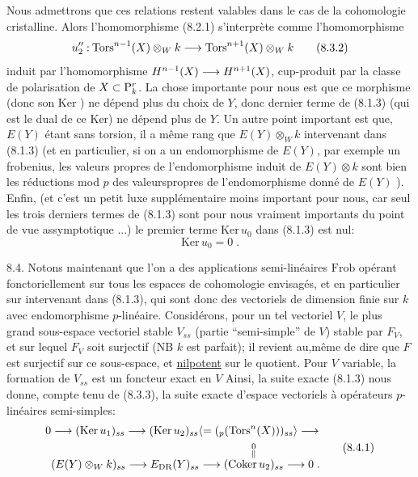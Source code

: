 Nous admettrons que ces relations restent valables dans le cas de la cohomologie cristalline. Alors l'homomorphisme (8.2.1) s'interprète comme l'homomorphisme
\[
u''_2\mathbin{:}\mathrm{Tors}^{n-1}(X)\otimes_W k\longrightarrow\mathrm{Tors}^{n+1}(X)\otimes_W k
\tag*{(8.3.2)}
\]
induit par l'homomorphisme $H^{n-1}(X)\longrightarrow H^{n+1}(X)$, cup-produit par la classe de polarisation de $X\subset\mathrm P^r_k$. La chose importante pour nous est que ce morphisme (donc son Ker ) ne dépend plus du choix de $Y$, donc    dernier terme de (8.1.3)  (qui est le dual de ce Ker) ne dépend plus de $Y$. Un autre point important est que, $E(Y)$ étant sans torsion, il a même rang que $E(Y)\otimes_W k$ intervenant dans (8.1.3) (et en particulier, si on a un endomorphisme de $E(Y)$, par exemple un frobenius, les valeurs propres de l'endomorphisme induit de $E(Y)\otimes k$ sont bien les réductions
mod $p$ des valeurspropres de l'endomorphisme donné de $E(Y)$ ). Enfin, (et c'est un petit luxe supplémentaire moins important pour nous, car seul les trois derniers termes de (8.1.3) sont pour nous vraiment importants du point de vue assymptotique ...)  le premier terme $\mathrm{Ker}\,u_0$ dans (8.1.3) est nul:
\[
\mathrm{Ker}\,u_0=0\;.
\tag*{(8.3.3)}
\]

8.4. Notons maintenant que l'on a des applications semi-linéaires $\mathrm{Frob}$ opérant fonctoriellement sur tous les espaces de cohomologie envisagés, et en particulier sur   intervenant dans (8.1.3), qui sont donc des vectoriels de dimension finie sur $k$ avec endomorphisme $p$-linéaire. Considérons, pour un tel vectoriel $V$, le plus grand sous-espace vectoriel stable $V_{ss}$ (partie ``semi-simple'' de $V$) stable par $F_V$, et sur lequel $F_V$ soit  surjectif (NB $k$ est parfait);  il revient au,même de dire que $F$ est surjectif sur ce sous-espace, et \uline{nilpotent} sur le quotient. Pour $V$ variable, la formation de $V_{ss}$ est un foncteur exact en $V$ Ainsi, la suite exacte (8.1.3) nous donne, compte tenu de (8.3.3), la suite exacte d'espace vectoriels à opérateurs $p$-linéaires semi-simples:
\[
\begin{aligned}
0&\handwritten{\longrightarrow}(\mathrm{Ker}\,u_1)_{ss}\handwritten{\longrightarrow}(\mathrm{Ker}\,u_2)_{ss}
\inserted{\handwritten{=({}_p(\mathrm{Tors}^n(X)))_{ss}}}\handwritten{\longrightarrow}\\
& (E(Y)\otimes_W k)_{ss}\handwritten{\longrightarrow}E_{\rm DR}(Y)_{ss}\handwritten{\longrightarrow}
\overset{\handwritten{\substack{0\\\Vert}}}{(\mathrm{Coker}\,u_2)_{ss}}\handwritten{\longrightarrow}0\;.
\end{aligned}
\tag*{(8.4.1)}
\]

